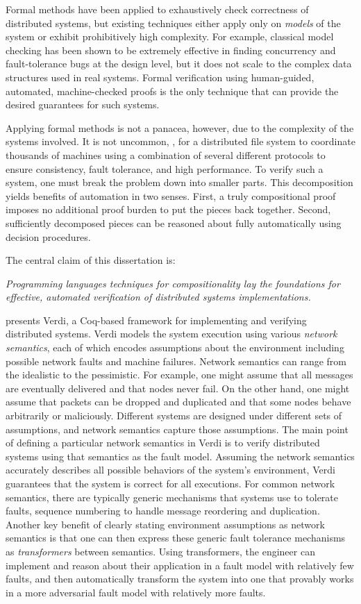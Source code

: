 Formal methods have been applied
  to exhaustively check correctness of distributed systems,
  but existing techniques either
    apply only on \emph{models} of the system or
    exhibit prohibitively high complexity.
For example, classical model checking
  has been shown to be extremely effective
  in finding concurrency and fault-tolerance bugs at the design level,
  but it does not scale to the complex data structures used in real systems.
Formal verification
  using human-guided, automated, machine-checked proofs
  is the only technique that can provide the desired guarantees for such systems.

Applying formal methods is not a panacea, however, due to the
complexity of the systems involved.  It is not uncommon, \eg, for a
distributed file system to coordinate thousands of machines using a
combination of several different protocols to ensure consistency,
fault tolerance, and high performance.  To verify such a
system, one must break the problem down into smaller parts.
This decomposition yields benefits of automation in two senses.
First, a truly compositional proof imposes no additional proof
burden to put the pieces back together. Second, sufficiently
decomposed pieces can be reasoned about fully automatically
using decision procedures. 

The central claim of this dissertation is:
\begin{center}
\emph{Programming languages techniques for compositionality
  lay the foundations for effective, automated verification of
  distributed systems implementations.
}
\end{center}

 presents Verdi, a Coq-based framework for implementing and
verifying distributed systems.  Verdi models the system execution
using various \emph{network semantics}, each of which encodes
assumptions about the environment including possible network faults
and machine failures.  Network semantics can range from the idealistic
to the pessimistic. For example, one might assume that all messages
are eventually delivered and that nodes never fail. On the other hand,
one might assume that packets can be dropped and duplicated and that
some nodes behave arbitrarily or maliciously. Different systems are
designed under different sets of assumptions, and network semantics
capture those assumptions.
The main point of defining a particular network semantics in Verdi is to verify
distributed systems using that semantics as the fault model.
Assuming the network semantics
accurately describes all possible behaviors of the system's
environment, Verdi guarantees that the system is correct for all executions.
For common network semantics, there are typically generic mechanisms
that systems use to tolerate faults, \eg sequence numbering to handle
message reordering and duplication. Another key benefit of clearly
stating environment assumptions as network semantics is that one
can then express these generic fault tolerance mechanisms as \emph{transformers}
between semantics.
Using transformers, the engineer can implement and reason about their
application in a fault model
with relatively few faults, and then automatically transform the system
into one that provably works in a more adversarial fault model with
relatively more faults. 

